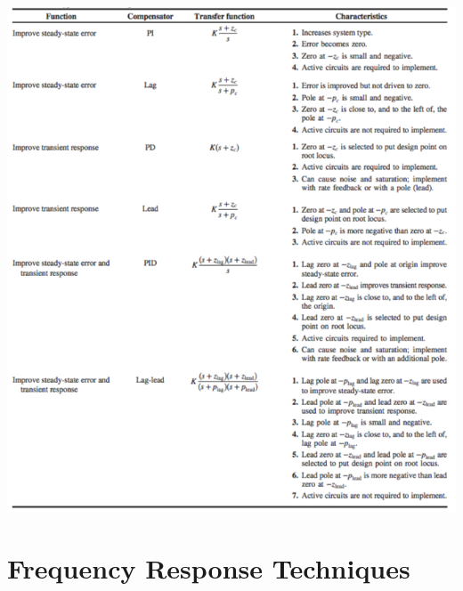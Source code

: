 \documentclass[11pt]{article}
\begin{document}
    \pagebreak 

    \begin{center}
        \includegraphics[width=375 px]{img/comps} \\
    \end{center}  

    \pagebreak


    \section{Frequency Response Techniques}

    \pagebreak


    
\end{document}
